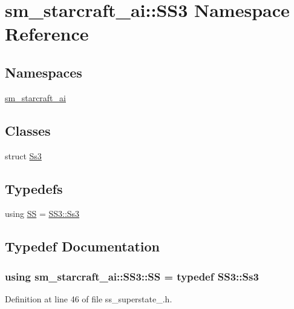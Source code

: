 \hypertarget{namespacesm__starcraft__ai_1_1SS3}{}\section{sm\+\_\+starcraft\+\_\+ai\+:\+:S\+S3 Namespace Reference}
\label{namespacesm__starcraft__ai_1_1SS3}
\subsection*{Namespaces}
\begin{DoxyCompactItemize}
\item 
 \hyperlink{namespacesm__starcraft__ai_1_1SS3_1_1sm__starcraft__ai}{sm\+\_\+starcraft\+\_\+ai}
\end{DoxyCompactItemize}
\subsection*{Classes}
\begin{DoxyCompactItemize}
\item 
struct \hyperlink{structsm__starcraft__ai_1_1SS3_1_1Ss3}{Ss3}
\end{DoxyCompactItemize}
\subsection*{Typedefs}
\begin{DoxyCompactItemize}
\item 
using \hyperlink{namespacesm__starcraft__ai_1_1SS3_a7ababe324e235e804e7878b53fdf7171}{SS} = \hyperlink{structsm__starcraft__ai_1_1SS3_1_1Ss3}{S\+S3\+::\+Ss3}
\end{DoxyCompactItemize}


\subsection{Typedef Documentation}
\subsubsection[{\texorpdfstring{SS}{SS}}]{\setlength{\rightskip}{0pt plus 5cm}using {\bf sm\+\_\+starcraft\+\_\+ai\+::\+S\+S3\+::\+SS} = typedef {\bf S\+S3\+::\+Ss3}}\hypertarget{namespacesm__starcraft__ai_1_1SS3_a7ababe324e235e804e7878b53fdf7171}{}\label{namespacesm__starcraft__ai_1_1SS3_a7ababe324e235e804e7878b53fdf7171}


Definition at line 46 of file ss\+\_\+superstate\+\_.\+h.

